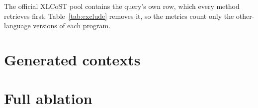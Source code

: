 \documentclass[11pt]{article}
\newcommand{\method}{SAE\mbox{-}IDF\xspace}
\begin{document}
The official XLCoST pool contains the query's own row, which every method retrieves first.
Table~\ref{tab:exclude} removes it, so the metrics count only the other-language versions of each program.

\begin{table}[H]
  \centering\footnotesize
  
  \caption{XLCoST program-level search with the query's own row excluded from the pool (official metric definitions otherwise). \method beats Dense in every language on both metrics; word TF-IDF stays marginally ahead on MRR in most languages.}
  \label{tab:exclude}
\end{table}

\section{Generated contexts}
\label{app:generated}

\begin{table}[H]
  \centering\footnotesize
  
  \caption{Generated versus native contexts (MRR). ``One LLM'': both sides described by the same generator; ``two LLMs'': the source side by one generator and the target side by another, each seeing only its own system's data; ``shared metadata'': the first drug run, in which both names were given the same pharmacologic-class text. With generated text, removing the first principal component of the dense vectors matches or beats \method on every task except NELL $\to$ DBpedia with two generators (0.966 vs.\ 0.969); with native context \method leads everywhere except MultiFarm Chinese (0.754 vs.\ 0.760). Drug names have no native context and are not in the main table.}
  \label{tab:generated}
\end{table}

\section{Full ablation}
\label{app:ablation}

\begin{table}[H]
  \centering\small
  \begin{minipage}{0.92\textwidth}\end{minipage}
  \caption{\method MRR across SAE width, sparsity and model size (Gemma Scope SAEs on Gemma-2-2B, 9B and 27B; miniF2F). Every entry beats the dense baseline in its row group. These runs were repeated separately from Table~\ref{tab:main}; at the main setting they differ from it by at most 0.006 MRR.}
  \label{tab:ablation}
\end{table}
\end{document}
